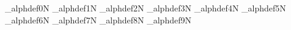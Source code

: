 \brl@info_alphdef{0}{N}
\brl@info_alphdef{1}{N}
\brl@info_alphdef{2}{N}
\brl@info_alphdef{3}{N}
\brl@info_alphdef{4}{N}
\brl@info_alphdef{5}{N}
\brl@info_alphdef{6}{N}
\brl@info_alphdef{7}{N}
\brl@info_alphdef{8}{N}
\brl@info_alphdef{9}{N}

\def\brl@info_numbermode{%
  \brl@info_alphdef{.}{N}
}
\def\brl@info_textmode{%
  \brl@info_alphdef{.}{T}
}
\def\brl@info_jpmode{%
  \brl@info_alphdef{.}{J}
}
\def\brl@info_infomode{%
  \brl@info_alphdef{\ }{W}%
}
\def\brl@info_verbmode{%
  \brl@info_alphdef{\ }{R}%
}


\endinput


